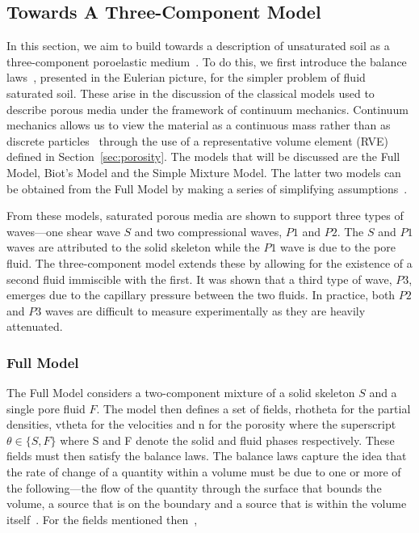 \documentclass[twocolumn]{article}
\begin{document}
\subsection{Towards A Three-Component Model}
In this section, we aim to build towards a description of unsaturated soil as a three-component poroelastic medium~\cite{detmann_propagation_2008}. To do this, we first introduce the balance laws~\cite{jog_2015}, presented in the Eulerian picture, for the simpler problem of fluid saturated soil. These arise in the discussion of the classical models used to describe porous media under the framework of continuum mechanics. Continuum mechanics allows us to view the material as a continuous mass rather than as discrete particles~\cite{ostoja-starzewski_zhang_2016} through the use of a representative volume element (RVE) defined in Section~\ref{sec:porosity}. The models that will be discussed are the Full Model, Biot’s Model and the Simple Mixture Model. The latter two models can be obtained from the Full Model by making a series of simplifying assumptions~\cite{detmann_surface_wave_2006}.

From these models, saturated porous media are shown to support three types of waves---one shear wave $S$ and two compressional waves, $P1$ and $P2$. The $S$ and $P1$ waves are attributed to the solid skeleton while the $P1$ wave is due to the pore fluid. The three-component model extends these by allowing for the existence of a second fluid immiscible with the first. It was shown that a third type of wave, $P3$, emerges due to the capillary pressure between the two fluids. In practice, both $P2$ and $P3$ waves are difficult to measure experimentally as they are heavily attenuated.

\subsubsection{Full Model}
The Full Model considers a two-component mixture of a solid skeleton $S$ and a single pore fluid $F$. The model then defines a set of fields, rhotheta for the partial densities, vtheta for the velocities and n for the porosity where the superscript $\theta \in \{S, F\}$ where S and F denote the solid and fluid phases respectively. These fields must then satisfy the balance laws. The balance laws capture the idea that the rate of change of a quantity within a volume must be due to one or more of the following---the flow of the quantity through the surface that bounds the volume, a source that is on the boundary and a source that is within the volume itself~\cite{jog_2015}. For the fields mentioned then~\cite{wilmanski_2002},
\end{document}

